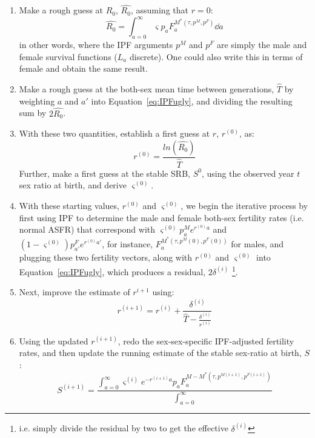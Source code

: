 \begin{enumerate}
  \item Make a rough guess at $R_0$, $\widehat{R_0}$, assuming that $r = 0$:
  \begin{equation}
  \widehat{R_0} = \int_{a=0}^\infty \varsigma p_aF_a^{M^\ast(\tau,p^{M},
  p^{F})} \dd a
  \end{equation}
  in other words, where the IPF arguments $p^{M}$ and $p^{F}$ are simply the
  male and female survival functions ($L_a$ discrete). One could also write this
  in terms of female and obtain the same result.
  \item Make a rough guess at the both-sex mean time between generations,
  $\widehat{T}$ by weighting $a$ and $a'$ into Equation~\eqref{eq:IPFugly},
  and dividing the resulting sum by $2\widehat{R_0}$.
  \item With these two quantities, establish a first guess at $r$,
  $r^{(0)}$, as:
  \begin{equation}
  r^{(0)} = \frac{ln(\widehat{R_0})}{\widehat{T}}
  \end{equation}
  Further, make a first guess at the stable SRB, $S^0$, using
  the observed year $t$ sex ratio at birth, and derive $\varsigma^{(0)}$.
  \item With these starting values, $r^{(0)}$ and $\varsigma^{(0)}$, we begin
  the iterative process by first using IPF to determine the male and female
  both-sex fertility rates (i.e. normal ASFR) that correspond with
  $\varsigma^{(0)} p_a^Me^{r^{(0)}a}$ and $(1-\varsigma^{(0)})p_{a'}^Fe^{r^{(0)}a'}$, for
  instance, $F_a^{M^\ast(\tau,p^{M}(0), p^{F}(0))}$ for males, and plugging
  these two fertility vectors, along with $r^{(0)}$ and $\varsigma^{(0)}$ into
  Equation~\eqref{eq:IPFugly}, which produces a residual, $2\delta^{(i)}$ \footnote{i.e. 
  simply divide the residual by two to get the effective $\delta^{(i)}$}.
  \item Next, improve the estimate of $r^{i+1}$ using: 
  \begin{equation}
  r^{(i+1)} = r^{(i)} + \frac{\delta^{(i)}}{\widehat{T} -
\frac{\delta ^{(i)}}{r^{(i)} }}
  \end{equation}
  \item Using the updated $r^{(i+1)}$, redo the sex-sex-specific IPF-adjusted
  fertility rates, and then update the running estimate of the stable
  sex-ratio at birth, $S$:
  \begin{equation}
  S^{(i+1)} = \frac{\int_{a=0}^\infty \varsigma^{(i)}
  e^{-r^{(i+1)}a}p_aF_a^{M-M^\ast(\tau,p^{M(i+1)}, p^{F(i+1)})}}{\int_{a=0}^\infty
}
\end{equation}
\end{enumerate}
